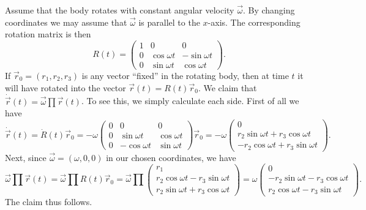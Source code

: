 \documentclass[article, a4paper, 11pt, oneside]{memoir}
\numberwithin{equation}{chapter}
\begin{document}
Assume that the body rotates with constant angular velocity $\vec{\omega}$. By changing coordinates we may assume that $\vec{\omega}$ is parallel to the $x$-axis. The corresponding rotation matrix is then
%
\begin{equation*}
    R(t) =
    \begin{pmatrix}
        1 & 0 & 0 \\
        0 & \cos \omega t & -\sin \omega t \\
        0 & \sin \omega t & \cos \omega t
    \end{pmatrix}.
\end{equation*}
%
If $\vec{r}_0 = (r_1, r_2, r_3)$ is any vector \enquote{fixed} in the rotating body, then at time $t$ it will have rotated into the vector $\vec{r}(t) = R(t) \vec{r}_0$. We claim that $\dot{\vec{r}}(t) = \vec{\omega} \prod \vec{r}(t)$. To see this, we simply calculate each side. First of all we have
%
\begin{equation*}
    \dot{\vec{r}}(t)
        = \dot{R}(t) \vec{r}_0
        = -\omega \begin{pmatrix}
            0 & 0 & 0 \\
            0 & \sin \omega t & \cos \omega t \\
            0 & -\cos \omega t & \sin \omega t
        \end{pmatrix} \vec{r}_0
        = -\omega \begin{pmatrix}
            0 \\
            r_2 \sin \omega t + r_3 \cos \omega t \\
            -r_2 \cos \omega t + r_3 \sin \omega t
        \end{pmatrix}.
\end{equation*}
%
Next, since $\vec{\omega} = (\omega,0,0)$ in our chosen coordinates, we have
%
\begin{equation*}
    \vec{\omega} \prod \vec{r}(t)
        = \vec{\omega} \prod R(t) \vec{r}_0
        = \vec{\omega} \prod \begin{pmatrix}
            r_1 \\
            r_2 \cos \omega t - r_3 \sin \omega t \\
            r_2 \sin \omega t + r_3 \cos \omega t
        \end{pmatrix}
        = \omega \begin{pmatrix}
            0 \\
            - r_2 \sin \omega t - r_3 \cos \omega t \\
            r_2 \cos \omega t - r_3 \sin \omega t
        \end{pmatrix}.
\end{equation*}
%
The claim thus follows.
\end{document}
